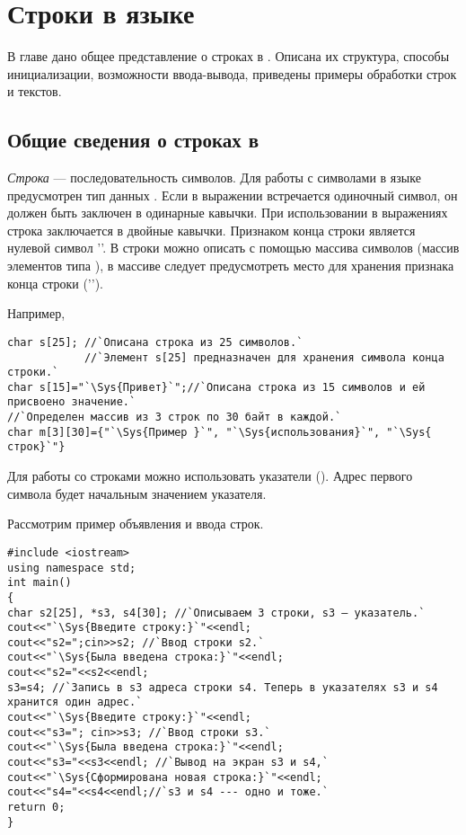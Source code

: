\chapter[Строки в языке \Sys{C++}]{Строки в языке }\label{ch08}
В главе дано общее представление о строках в . Описана их структура, способы инициализации, возможности ввода-вывода,
приведены примеры обработки строк и текстов.

\section[Общие сведения о строках в \Sys{C++}]{Общие сведения о строках в }\label{ch08:1}
\emph{Строка} --- последовательность символов. Для работы с символами в языке  предусмотрен
тип данных . Если в выражении встречается одиночный символ, он должен быть заключен в одинарные
кавычки. При использовании в выражениях строка заключается в двойные кавычки. Признаком конца строки является нулевой
символ ''. В  строки можно описать с помощью массива символов (массив
элементов типа ), в массиве следует предусмотреть место для хранения признака конца строки
('').

Например, 
\begin{lstlisting}
char s[25]; //`Описана строка из 25 символов.`
            //`Элемент s[25] предназначен для хранения символа конца строки.`
char s[15]="`\Sys{Привет}`";//`Описана строка из 15 символов и ей присвоено значение.`
//`Определен массив из 3 строк по 30 байт в каждой.`
char m[3][30]={"`\Sys{Пример }`", "`\Sys{использования}`", "`\Sys{ строк}`"} 
\end{lstlisting}

Для работы со строками можно использовать указатели (). Адрес первого символа будет начальным
значением указателя.

Рассмотрим пример объявления и ввода строк.
\begin{lstlisting}
#include <iostream>
using namespace std;
int main()
{
char s2[25], *s3, s4[30]; //`Описываем 3 строки, s3 — указатель.`
cout<<"`\Sys{Введите строку:}`"<<endl;
cout<<"s2=";cin>>s2; //`Ввод строки s2.`
cout<<"`\Sys{Была введена строка:}`"<<endl;
cout<<"s2="<<s2<<endl;
s3=s4; //`Запись в s3 адреса строки s4. Теперь в указателях s3 и s4 хранится один адрес.`
cout<<"`\Sys{Введите строку:}`"<<endl;
cout<<"s3="; cin>>s3; //`Ввод строки s3.`
cout<<"`\Sys{Была введена строка:}`"<<endl;
cout<<"s3="<<s3<<endl; //`Вывод на экран s3 и s4,`
cout<<"`\Sys{Сформирована новая строка:}`"<<endl;
cout<<"s4="<<s4<<endl;//`s3 и s4 --- одно и тоже.`
return 0;
}
\end{lstlisting}

